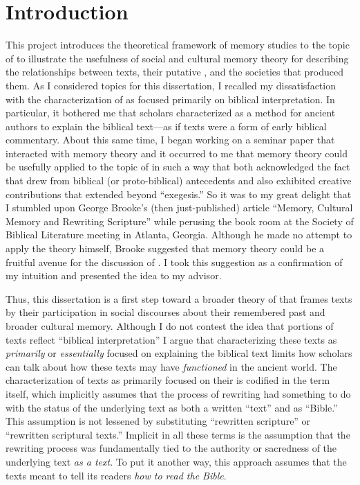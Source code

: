 
\chapter*{Introduction}


This project introduces the theoretical framework of memory studies to the topic of \rwb to illustrate the usefulness of social and cultural memory theory for describing the relationships between \rwb texts, their putative \vorlagen, and the societies that produced them. As I considered topics for this dissertation, I recalled my dissatisfaction with the characterization of \rwb as focused primarily on biblical interpretation. In particular, it bothered me that scholars characterized \rwb as a method for ancient authors to explain the biblical text---as if \rwb texts were a form of early biblical commentary. About this same time, I began working on a seminar paper that interacted with memory theory and it occurred to me that memory theory could be usefully applied to the topic of \rwb in such a way that both acknowledged the fact that \rwb drew from biblical (or proto-biblical) antecedents and also exhibited creative contributions that extended beyond ``exegesis.'' So it was to my great delight that I stumbled upon George Brooke's (then just-published) article ``Memory, Cultural Memory and Rewriting Scripture'' while perusing the book room at the Society of Biblical Literature meeting in Atlanta, Georgia.%
    \autocite{brooke_zsengeller2014}
Although he made no attempt to apply the theory himself, Brooke suggested that memory theory could be a fruitful avenue for the discussion of \rwb. I took this suggestion as a confirmation of my intuition and presented the idea to my advisor.

Thus, this dissertation is a first step toward a broader theory of \rwb that frames \rwb texts by their participation in social discourses about their remembered past and broader cultural memory. Although I do not contest the idea that portions of \rwb texts reflect ``biblical interpretation'' I argue that characterizing these texts as \emph{primarily} or \emph{essentially} focused on explaining the biblical text limits how scholars can talk about how these texts may have \emph{functioned} in the ancient world. The characterization of \rwb texts as primarily focused on their \vorlagen is codified in the term \rwb itself, which implicitly assumes that the process of rewriting had something to do with the status of the underlying text as both a written ``text'' and as ``Bible.'' This assumption is not lessened by substituting ``rewritten scripture'' or ``rewritten scriptural texts.'' Implicit in all these terms is the assumption that the rewriting process was fundamentally tied to the authority or sacredness of the underlying text \emph{as a text}. To put it another way, this approach assumes that the \rwb texts meant to tell its readers \emph{how to read the Bible}.

